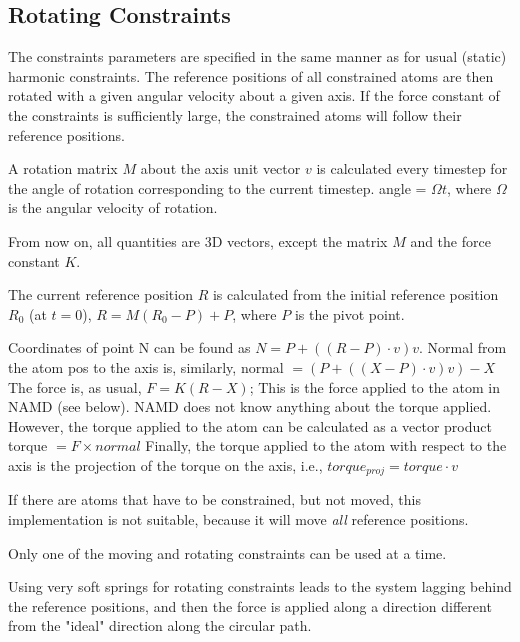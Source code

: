 \subsection{Rotating Constraints}

The constraints parameters are specified in the same manner as for
usual (static) harmonic constraints. The reference positions of all
constrained atoms are then rotated with a given angular velocity
about a given axis. If the force constant of the constraints is
sufficiently
large, the constrained atoms will follow their reference positions.

A rotation matrix $M$ about the axis unit vector $v$ is calculated every
timestep
for the angle of rotation corresponding to the current timestep.
    angle = $\Omega t$,
where $\Omega$ is the angular velocity of rotation.

From now on, all quantities are 3D vectors, except the matrix $M$ and the
force constant $K$.

The current reference position $R$ is calculated from the initial
reference
position $R_0$ (at $t=0$),
    $R = M (R_0 - P) + P$,
where $P$ is the pivot point.

%
%
%

Coordinates of point N can be found as
   $N = P + ( (R - P) \cdot v ) v$.
Normal from the atom pos to the axis is, similarly,
   normal $= ( P + ( (X - P) \cdot v ) v ) - X$
The force is, as usual,
   $F = K (R - X)$;
This is the force applied to the atom in NAMD (see below).
NAMD does not know anything about the torque
applied. However, the torque applied to the atom can be calculated
as a vector product
   torque $= F \times normal$
Finally, the torque applied to the atom with respect to the axis
is the projection of the torque on the axis, i.e.,
   $torque_{proj} = torque \cdot v$

If there are atoms that have to be constrained, but not moved,
this implementation is not suitable, because it will move {\em all}
reference positions.

Only one of the moving and rotating constraints can be used at a
time.

Using very soft springs for rotating constraints leads to the system
   lagging behind the reference positions, and then the force is applied
   along a direction different from the "ideal" direction along the
   circular path.


